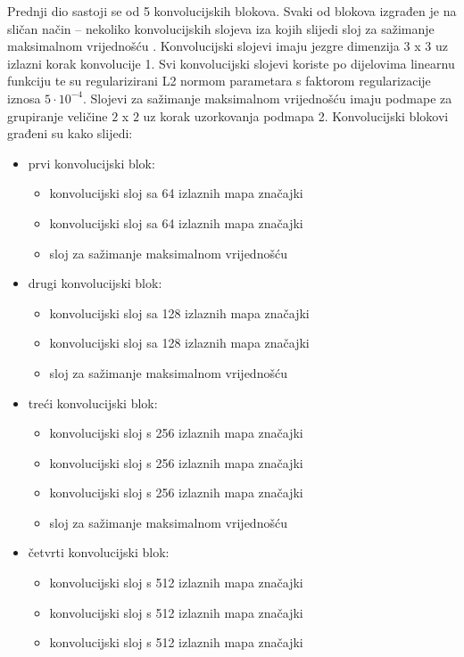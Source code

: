 \documentclass[times, utf8, diplomski, numeric]{fer}
\begin{document}
Prednji dio sastoji se od 5 konvolucijskih blokova. 
Svaki od blokova izgrađen je na sličan način -- nekoliko konvolucijskih slojeva iza kojih slijedi sloj za sažimanje maksimalnom vrijednošću .
Konvolucijski slojevi imaju jezgre dimenzija $3$ x $3$ uz izlazni korak konvolucije  1. 
Svi konvolucijski slojevi koriste po dijelovima linearnu funkciju  te su regularizirani L2 normom parametara s faktorom regularizacije iznosa $5\cdot10^{-4}$.
Slojevi za sažimanje maksimalnom vrijednošću imaju podmape za grupiranje veličine $2$ x $2$ uz korak uzorkovanja podmapa 2.
Konvolucijski blokovi građeni su kako slijedi:
\begin{itemize}
 \item prvi konvolucijski blok:
 \begin{itemize}
  \item konvolucijski sloj sa 64 izlaznih mapa značajki
  \item konvolucijski sloj sa 64 izlaznih mapa značajki
  \item sloj za sažimanje maksimalnom vrijednošću
 \end{itemize}
  \item drugi konvolucijski blok:
 \begin{itemize}
  \item konvolucijski sloj sa 128 izlaznih mapa značajki
  \item konvolucijski sloj sa 128 izlaznih mapa značajki
  \item sloj za sažimanje maksimalnom vrijednošću
 \end{itemize}
   \item treći konvolucijski blok:
 \begin{itemize}
  \item konvolucijski sloj s 256 izlaznih mapa značajki
  \item konvolucijski sloj s 256 izlaznih mapa značajki
  \item konvolucijski sloj s 256 izlaznih mapa značajki
  \item sloj za sažimanje maksimalnom vrijednošću
 \end{itemize}
    \item četvrti konvolucijski blok:
 \begin{itemize}
  \item konvolucijski sloj s 512 izlaznih mapa značajki
  \item konvolucijski sloj s 512 izlaznih mapa značajki
  \item konvolucijski sloj s 512 izlaznih mapa značajki

\end{itemize}
\end{itemize}
\end{document}
